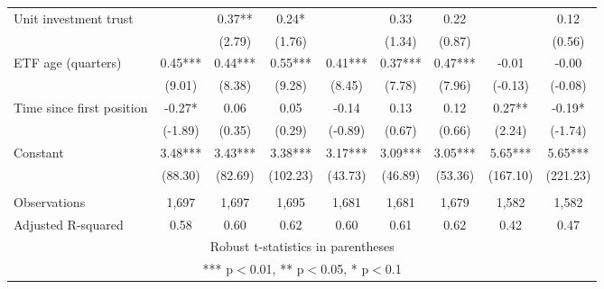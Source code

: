 \documentclass[]{article}
\begin{document}
\begin{tabular}{lcccccccc}
Unit investment trust &  & 0.37** & 0.24* &  & 0.33 & 0.22 &  & 0.12 \\
 &  & (2.79) & (1.76) &  & (1.34) & (0.87) &  & (0.56) \\
ETF age (quarters) & 0.45*** & 0.44*** & 0.55*** & 0.41*** & 0.37*** & 0.47*** & -0.01 & -0.00 \\
 & (9.01) & (8.38) & (9.28) & (8.45) & (7.78) & (7.96) & (-0.13) & (-0.08) \\
Time since first position & -0.27* & 0.06 & 0.05 & -0.14 & 0.13 & 0.12 & 0.27** & -0.19* \\
 & (-1.89) & (0.35) & (0.29) & (-0.89) & (0.67) & (0.66) & (2.24) & (-1.74) \\
Constant & 3.48*** & 3.43*** & 3.38*** & 3.17*** & 3.09*** & 3.05*** & 5.65*** & 5.65*** \\
 & (88.30) & (82.69) & (102.23) & (43.73) & (46.89) & (53.36) & (167.10) & (221.23) \\
 &  &  &  &  &  &  &  &  \\
Observations & 1,697 & 1,697 & 1,695 & 1,681 & 1,681 & 1,679 & 1,582 & 1,582 \\
 Adjusted R-squared & 0.58 & 0.60 & 0.62 & 0.60 & 0.61 & 0.62 & 0.42 & 0.47 \\ \hline
\multicolumn{9}{c}{ Robust t-statistics in parentheses} \\
\multicolumn{9}{c}{ *** p$<$0.01, ** p$<$0.05, * p$<$0.1} \\
\end{tabular}
\end{document}
